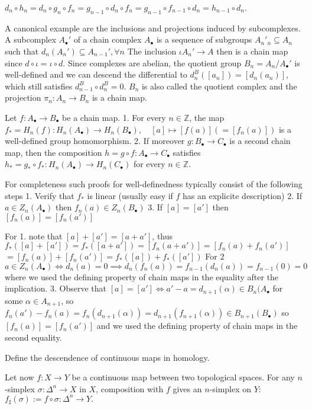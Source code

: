 \(d_n \circ h_n = d_n \circ g_n \circ f_n = g_{n-1} \circ d_n \circ f_n = g_{n-1} \circ f_{n-1} \circ d_n = h_{n-1} \circ d_n.\)

A canonical example are the inclusions and projections induced by subcomplexes.
A subcomplex \( A_{\bullet}' \) of a chain complex \( A_\bullet \) is a sequence of subgroups \(A_{n}'_n \subseteq A_{n} \) such that \( d_n(A_{n}') \subseteq A_{n-1}', \forall n \)
The inclusion \( \iota A_{n}' \to A \) then is a chain map since \( d \circ \iota = \iota \circ d \).
Since complexes are abelian, the quotient group \( B_n = A_n / A_{\bullet}' \) is well-defined and we can descend the differential to \( d^B_n([a_n]) = [d_n(a_n)] \),
which still satisfies \( d^B_{n-1} \circ d^B_{n} = 0 \). \( B_n \) is also called the quotient complex and the projection \( \pi_n : A_n \to B_n \) is a chain map.

Let \(f: A_\bullet \to B_\bullet\) be a chain map. 
1. For every \(n \in \mathbb{Z}\), the map 
\(f_* = H_n(f) : H_n(A_\bullet) \to H_n(B_\bullet), \quad [a] \mapsto [f(a)] (= [f_n(a)])\)
is a well-defined group homomorphism. 
2. If moreover \(g: B_\bullet \to C_\bullet\) is a second chain map, then the composition \(h = g \circ f: A_\bullet \to C_\bullet\) satisfies
\(h_* = g_* \circ f_* : H_n(A_\bullet) \to H_n(C_\bullet)\)
for every \(n \in \mathbb{Z}\).

For completeness such proofs for well-definedness typically consist of the following steps
1. Verify that \( f_{*} \) is linear (usually easy if \( f \) has an explicite description)
2. If \( a \in Z_n(A_\bullet) \) then \( f_n(a) \in Z_n(B_\bullet) \)
3. If \( [a] = [a'] \) then \( [f_n(a)] = [f_n(a')] \)

For 1. note that \( [a] + [a'] = [a + a'] \), thus 
\(f_*([a] + [a']) = f_*([a + a']) = [f_n(a + a')] = [f_n(a) + f_n(a')] \)
\(= [f_n(a)] + [f_n(a')] = f_*([a]) + f_*([a'])\)
For 2
\( a \in Z_n(A_\bullet) \iff d_n(a) = 0 \implies d_n(f_n(a)) = f_{n-1}(d_n(a)) = f_{n-1}(0) = 0\)
where we used the defining property of chain maps in the equality after the implication.
3.
Observe that \( [a] = [a'] \iff a' - a = d_{n+1}(\alpha) \in B_n(A_{\bullet}\) for some \( \alpha \in A_{n+1} \), so
\( f_n(a') - f_n(a) = f_n(d_{n+1}(\alpha)) = d_{n+1}(f_{n+1}(\alpha)) \in B_{n+1}(B_\bullet) \)
so \( [f_n(a)] = [f_n(a')] \) and we used the defining property of chain maps in the second equality.

Define the descendence of continuous maps in homology.

Let now \(f: X \to Y\) be a continuous map between two topological spaces. For any \(n\)-simplex \(\sigma: \Delta^n \to X\) in \(X\), composition with \(f\) gives an \(n\)-simplex on \(Y\):
\(f_\sharp(\sigma) := f \circ \sigma: \Delta^n \to Y.\)

